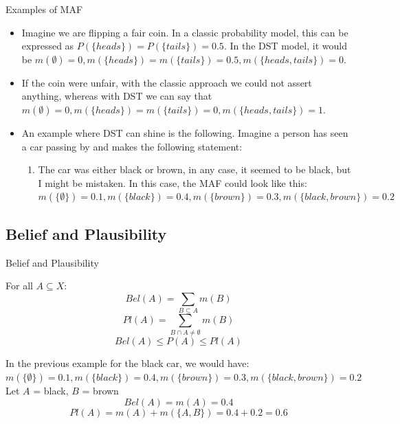 \documentclass[aspectratio=169]{beamer}
\begin{document}
\begin{frame}{Examples of MAF}
\begin{itemize}
    \item Imagine we are flipping a fair coin. In a classic probability model, this can be expressed as $P(\{heads\}) = P(\{tails\}) = 0.5$. In the DST model, it would be $m(\emptyset) = 0, m(\{heads\}) = m(\{tails\}) = 0.5, m(\{heads, tails\}) = 0$.
    \pause
    \item If the coin were unfair, with the classic approach we could not assert anything, whereas with DST we can say that $m(\emptyset) = 0, m(\{heads\}) = m(\{tails\}) = 0, m(\{heads, tails\}) = 1$.
    \pause
    \item An example where DST can shine is the following. Imagine a person has seen a car passing by and makes the following statement:
    \begin{enumerate}
        \item The car was either black or brown, in any case, it seemed to be black, but I might be mistaken.
        In this case, the MAF could look like this: $m(\{\emptyset\}) = 0.1, m(\{ black\}) = 0.4, m(\{ brown\}) = 0.3, m(\{ black, brown\}) = 0.2$
    \end{enumerate}
\end{itemize}
\end{frame}

\subsection{Belief and Plausibility}
\begin{frame}{Belief and Plausibility}
    \begin{block}
         For all \( A \subseteq X \):
          \[
          Bel(A) = \sum_{B \subseteq A} m(B)
          \]
        \[
          Pl(A) = \sum_{B \cap A \neq \emptyset} m(B)
          \]
            \[
            Bel(A) \le P(A) \le Pl(A)
            \]

    In the previous example for the black car, we would have:
    $m(\{\emptyset\}) = 0.1, m(\{ black\}) = 0.4, m(\{ brown\}) = 0.3, m(\{ black, brown\}) = 0.2$ \\
    Let $A$ = black, $B$ = brown
          \[
        Bel(A) = m(A) = 0.4 \]
        \[
        Pl(A) = m(A) + m(\{A, B\}) = 0.4 + 0.2 = 0.6
          \]
    \end{block}
\end{frame}
\end{document}

